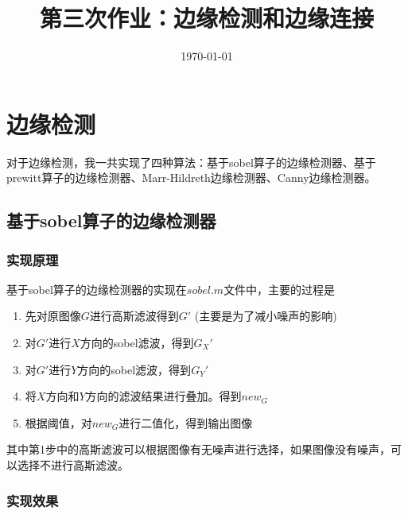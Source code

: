 \documentclass[11pt, a4paper, UTF8]{ctexart}
\title{第三次作业：边缘检测和边缘连接}
\date{\today}     %
\begin{document}
\maketitle


\tableofcontents
\newpage

\section{边缘检测}

对于边缘检测，我一共实现了四种算法：基于sobel算子的边缘检测器、基于prewitt算子的边缘检测器、Marr-Hildreth边缘检测器、Canny边缘检测器。

\subsection{基于sobel算子的边缘检测器}

\subsubsection{实现原理}
基于sobel算子的边缘检测器的实现在$sobel.m$文件中，主要的过程是
\begin{enumerate}
  \item 先对原图像$G$进行高斯滤波得到$G'$ (主要是为了减小噪声的影响)
  \item 对$G'$进行$X$方向的sobel滤波，得到$G_X'$
  \item 对$G'$进行$Y$方向的sobel滤波，得到$G_Y'$
  \item 将$X$方向和$Y$方向的滤波结果进行叠加。得到$new_G$
  \item 根据阈值，对$new_G$进行二值化，得到输出图像
\end{enumerate}
其中第1步中的高斯滤波可以根据图像有无噪声进行选择，如果图像没有噪声，可以选择不进行高斯滤波。

\subsubsection{实现效果}
\end{document}
